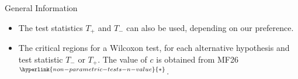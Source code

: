\documentclass[../Notes.tex]{subfiles}
\begin{document}
\begin{stbox}{General Information}
\begin{itemize}
\begin{enumerate}
\begin{table}[H]
\begin{tabular}{|Sc|Sc|Sc|Sc|Sc|Sc|}
          \hline
        \end{tabular}
        \caption{The value of the differences \(d_1,d_2,\dots,d_m\), which are then ranked according to their absolute size \(\lvert d_i \rvert\). For our syllabus, each \(d_i\) is always distinct.
        }
        \label{table:wilcoxon-working-table}
      \end{table}
      \item
      \begin{itemize}[label=\(\circ\)]
        \item \(t_{-}=\rule{0.5cm}{0.01mm}+\rule{0.5cm}{0.01mm}+\dots+\rule{0.5cm}{0.01mm}=\rule{0.5cm}{0.01mm}\)
        \item \(t_{+}=\rule{0.5cm}{0.01mm}+\rule{0.5cm}{0.01mm}+\dots+\rule{0.5cm}{0.01mm}=\rule{0.5cm}{0.01mm}\)
        \item The test statistic is \(T\coloneq\min\{T_{-},T_{+}\}=\rule{0.5cm}{0.01mm}\).
        \item Reject \(H_0\) if \(T=\rule{0.5cm}{0.01mm}\). (see table \ref{table:wilcoxon-critical-region})
      \end{itemize}
      \item Since \(t=\rule{0.5cm}{0.01mm}\,\square\, \rule{0.5cm}{0.01mm}\), there is sufficient/insufficient evidence, at the \(100\alpha\%\) significance level, to conclude that [\(H_1\) in context].
    \end{enumerate}
    \item The test statistics \(T_{+}\) and \(T_{-}\) can also be used, depending on our preference.
      \item The critical regions for a Wilcoxon test, for each alternative hypothesis and test statistic \(T_{-}\) or \(T_{+}\). The value of \(c\) is obtained from MF26\(^{\hyperlink{non-parametric-tests-n-value}{*}}\). 
      

\end{itemize}
\end{stbox}
\end{document}
